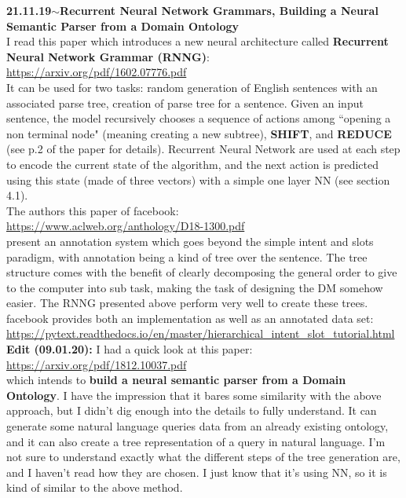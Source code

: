 \documentclass[11pt,a4paper]{article}
\newenvironment{loggentry}[2]%
{\noindent\textbf{#1}\hspace{1cm}$\mathbf{\sim}$\text{ }\textbf{#2}\\}{\vspace{0.5cm}}
\begin{document}
\begin{loggentry}{21.11.19}{Recurrent Neural Network Grammars, Building a Neural Semantic Parser from a Domain Ontology}

I read this paper which introduces a new neural architecture called \textbf{Recurrent Neural Network Grammar (RNNG)}:\\
\url{https://arxiv.org/pdf/1602.07776.pdf}\\
It can be used for two tasks: random generation of English sentences with an associated parse tree, creation of parse tree for a sentence. Given an input sentence, the model recursively chooses a sequence of actions among ``opening a non terminal node" (meaning creating a new subtree), \textbf{SHIFT}, and \textbf{REDUCE} (see p.2 of the paper for details). Recurrent Neural Network are used at each step to encode the current state of the algorithm, and the next action is predicted using this state (made of three vectors) with a simple one layer NN (see section 4.1).\\
The authors this paper of facebook:\\
\url{https://www.aclweb.org/anthology/D18-1300.pdf}\\
present an annotation system which goes beyond the simple intent and slots paradigm, with annotation being a kind of tree over the sentence. The tree structure comes with the benefit of clearly decomposing the general order to give to the computer into sub task, making the task of designing the DM somehow easier. The RNNG presented above perform very well to create these trees. facebook provides both an implementation as well as an annotated data set:\\
\url{https://pytext.readthedocs.io/en/master/hierarchical_intent_slot_tutorial.html}\\

\textbf{Edit (09.01.20):} I had a quick look at this paper:\\
\url{https://arxiv.org/pdf/1812.10037.pdf}\\
which intends to \textbf{build a neural semantic parser from a Domain Ontology}. I have the impression that it bares some similarity with the above approach, but I didn't dig enough into the details to fully understand. It can generate some natural language queries data from an already existing ontology, and it can also create a tree representation of a query in natural language. I'm not sure to understand exactly what the different steps of the tree generation are, and I haven't read how they are chosen. I just know that it's using NN, so it is kind of similar to the above method.

\end{loggentry}
\end{document}

